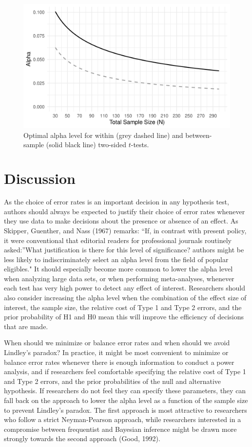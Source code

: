 \documentclass[
  english,
  ,man, a4paper,floatsintext]{apa6}
\begin{document}
\begin{figure}
\centering
\includegraphics{Justify_in_Practice_files/figure-latex/lindleyplot-1.pdf}
\caption{\label{fig:lindleyplot}Optimal alpha level for within (grey dashed line) and between-sample (solid black line) two-sided \(t\)-tests.}
\end{figure}

\hypertarget{discussion}{%
\section{Discussion}\label{discussion}}

As the choice of error rates is an important decision in any hypothesis test, authors should always be expected to justify their choice of error rates whenever they use data to make decisions about the presence or absence of an effect. As Skipper, Guenther, and Nass (1967) remarks: ``If, in contrast with present policy, it were conventional that editorial readers for professional journals routinely asked:''What justification is there for this level of significance? authors might be less likely to indiscriminately select an alpha level from the field of popular eligibles." It should especially become more common to lower the alpha level when analyzing large data sets, or when performing meta-analyses, whenever each test has very high power to detect any effect of interest. Researchers should also consider increasing the alpha level when the combination of the effect size of interest, the sample size, the relative cost of Type 1 and Type 2 errors, and the prior probability of H1 and H0 mean this will improve the efficiency of decisions that are made.

When should we minimize or balance error rates and when should we avoid Lindley's paradox? In practice, it might be most convenient to minimize or balance error rates whenever there is enough information to conduct a power analysis, and if researchers feel comfortable specifying the relative cost of Type 1 and Type 2 errors, and the prior probabilities of the null and alternative hypothesis. If researchers do not feel they can specify these parameters, they can fall back on the approach to lower the alpha level as a function of the sample size to prevent Lindley's paradox. The first approach is most attractive to researchers who follow a strict Neyman-Pearson approach, while researchers interested in a compromise between frequentist and Bayesian inference might be drawn more strongly towards the second approach (Good, 1992).
\end{document}

